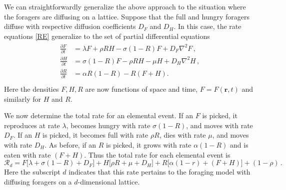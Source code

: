 \documentclass[11pt]{iopart}
\begin{document}
We can straightforwardly generalize the above approach to the situation where
the foragers are diffusing on a lattice.  Suppose that the full and hungry
foragers diffuse with respective diffusion coefficients $D_F$ and $D_H$.  In
this case, the rate equations \eqref{RE} generalize to the set of partial
differential equations
\begin{align}
  \label{pde}
\begin{split}
\frac{\partial F}{\partial t} &= \lambda F + \rho  RH - \sigma (1-R)F+D_F\nabla^2F\,,\\[0.125in]
\frac{\partial H}{\partial t}  &= \sigma (1-R)F - \rho RH - \mu H+D_H\nabla^2H\,, \\[0.125in]
\frac{\partial R}{\partial t}  &= \alpha R(1-R) -  R(F+H).\\
\end{split}
\end{align}
Here the densities $F,H,R$ are now functions of space and time,
$F=F(\mathbf{r},t)$ and similarly for $H$ and $R$.

We now determine the total rate for an elemental event.  If an $F$ is picked,
it reproduces at rate $\lambda$, becomes hungry with rate $\sigma(1-R)$, and
moves with rate $D_F$.  If an $H$ is picked, it becomes full with rate
$\rho R$, dies with rate $\mu$, and moves with rate $D_H$.  As before, if an
$R$ is picked, it grows with rate $\alpha(1-R)$ and is eaten with rate
$(F+H)$.  Thus the total rate for each elemental event is
\begin{equation}
\mathcal{R}_d=F\big[\lambda +\sigma(1-R)+D_F\big]+ H\big[\rho R+\mu+D_H\big]+
R\big[\alpha(1-r)+(F+H)\big]+(1-\rho)\,.
\end{equation}
Here the subscript $d$ indicates that this rate pertains to the foraging
model with diffusing foragers on a $d$-dimensional lattice.
\end{document}
